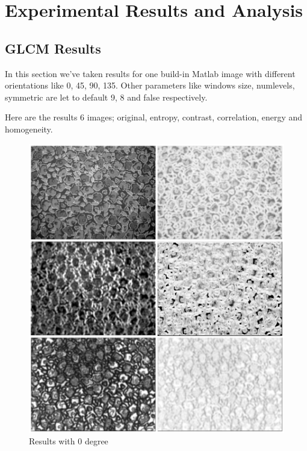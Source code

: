 \documentclass{article}
\begin{document}
\section{Experimental Results and Analysis}

\subsection{GLCM Results}

In this section we've taken results for one build-in Matlab image with different orientations like 0, 45, 90, 135. Other parameters like windows size, numlevels, symmetric are let to default 9, 8 and false respectively.

Here are the results 6 images; original, entropy, contrast, correlation, energy and homogeneity.

\begin{figure}[H]
\begin{center}
\includegraphics[scale=0.35]{result1.jpeg}
\caption{Results with 0 degree}
\end{center}
\end{figure}	
\end{document}
